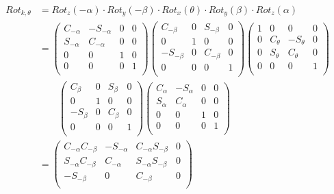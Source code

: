 \documentclass[a4paper,11pt]{article}
\begin{document}
\begin {enumerate}
		\begin{align*}
			Rot_{k, \theta} &= Rot_{z}(-\alpha) \cdot Rot_{y}(-\beta) \cdot Rot_{x}(\theta) \cdot Rot_{y}(\beta) \cdot Rot_{z}(\alpha)\\
			&= \begin{pmatrix}
				C_{-\alpha} & -S_{-\alpha} & 0 & 0\\
				S_{-\alpha} & C_{-\alpha} & 0 & 0\\
				0 & 0 & 1 & 0\\
				0 & 0 & 0 & 1\\
			\end{pmatrix} \begin{pmatrix}
				C_{-\beta} & 0 & S_{-\beta} & 0\\
				0 & 1 & 0 & 0\\
				-S_{-\beta} & 0 & C_{-\beta} & 0\\
				0 & 0 & 0 & 1\\
			\end{pmatrix} \begin{pmatrix}
				1 & 0 & 0 & 0\\
				0 & C_{\theta} & -S_{\theta} & 0\\
				0 & S_{\theta} & C_{\theta} & 0\\
				0 & 0 & 0 & 1\\
			\end{pmatrix}\\
			&\qquad \begin{pmatrix}
				C_{\beta} & 0 & S_{\beta} & 0\\
				0 & 1 & 0 & 0\\
				-S_{\beta} & 0 & C_{\beta} & 0\\
				0 & 0 & 0 & 1\\
			\end{pmatrix} \begin{pmatrix}
				C_{\alpha} & -S_{\alpha} & 0 & 0\\
				S_{\alpha} & C_{\alpha} & 0 & 0\\
				0 & 0 & 1 & 0\\
				0 & 0 & 0 & 1\\
			\end{pmatrix}\\
			&= \begin{pmatrix}
				C_{-\alpha}C_{-\beta} & -S_{-\alpha} & C_{-\alpha}S_{-\beta} & 0\\
				S_{-\alpha}C_{-\beta} & C_{-\alpha} & S_{-\alpha}S_{-\beta} & 0\\
				-S_{-\beta} & 0 & C_{-\beta} & 0\\

\end{pmatrix}
\end{align*}
\end{enumerate}
\end{document}
